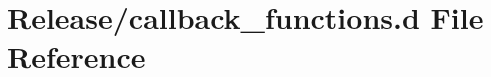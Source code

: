 \hypertarget{callback__functions_8d}{}\section{Release/callback\+\_\+functions.d File Reference}
\label{callback__functions_8d}
